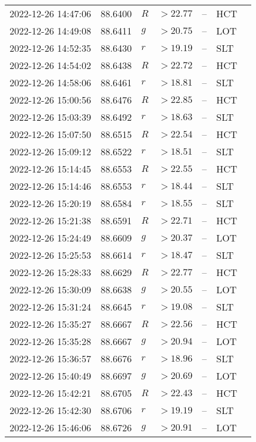 \documentclass{nature_plusfigure}
\begin{document}
\begin{supplement}
\begin{center}
\begin{longtable}{lllllll}
2022-12-26 14:47:06 & 88.6400 & $R$ & $>22.77$ & -- & HCT &  \\ 
2022-12-26 14:49:08 & 88.6411 & $g$ & $>20.75$ & -- & LOT &  \\ 
2022-12-26 14:52:35 & 88.6430 & $r$ & $>19.19$ & -- & SLT &  \\ 
2022-12-26 14:54:02 & 88.6438 & $R$ & $>22.72$ & -- & HCT &  \\ 
2022-12-26 14:58:06 & 88.6461 & $r$ & $>18.81$ & -- & SLT &  \\ 
2022-12-26 15:00:56 & 88.6476 & $R$ & $>22.85$ & -- & HCT &  \\ 
2022-12-26 15:03:39 & 88.6492 & $r$ & $>18.63$ & -- & SLT &  \\ 
2022-12-26 15:07:50 & 88.6515 & $R$ & $>22.54$ & -- & HCT &  \\ 
2022-12-26 15:09:12 & 88.6522 & $r$ & $>18.51$ & -- & SLT &  \\ 
2022-12-26 15:14:45 & 88.6553 & $R$ & $>22.55$ & -- & HCT &  \\ 
2022-12-26 15:14:46 & 88.6553 & $r$ & $>18.44$ & -- & SLT &  \\ 
2022-12-26 15:20:19 & 88.6584 & $r$ & $>18.55$ & -- & SLT &  \\ 
2022-12-26 15:21:38 & 88.6591 & $R$ & $>22.71$ & -- & HCT &  \\ 
2022-12-26 15:24:49 & 88.6609 & $g$ & $>20.37$ & -- & LOT &  \\ 
2022-12-26 15:25:53 & 88.6614 & $r$ & $>18.47$ & -- & SLT &  \\ 
2022-12-26 15:28:33 & 88.6629 & $R$ & $>22.77$ & -- & HCT &  \\ 
2022-12-26 15:30:09 & 88.6638 & $g$ & $>20.55$ & -- & LOT &  \\ 
2022-12-26 15:31:24 & 88.6645 & $r$ & $>19.08$ & -- & SLT &  \\ 
2022-12-26 15:35:27 & 88.6667 & $R$ & $>22.56$ & -- & HCT &  \\ 
2022-12-26 15:35:28 & 88.6667 & $g$ & $>20.94$ & -- & LOT &  \\ 
2022-12-26 15:36:57 & 88.6676 & $r$ & $>18.96$ & -- & SLT &  \\ 
2022-12-26 15:40:49 & 88.6697 & $g$ & $>20.69$ & -- & LOT &  \\ 
2022-12-26 15:42:21 & 88.6705 & $R$ & $>22.43$ & -- & HCT &  \\ 
2022-12-26 15:42:30 & 88.6706 & $r$ & $>19.19$ & -- & SLT &  \\ 
2022-12-26 15:46:06 & 88.6726 & $g$ & $>20.91$ & -- & LOT &  \\ 

\end{longtable}
\end{center}
\end{supplement}
\end{document}

